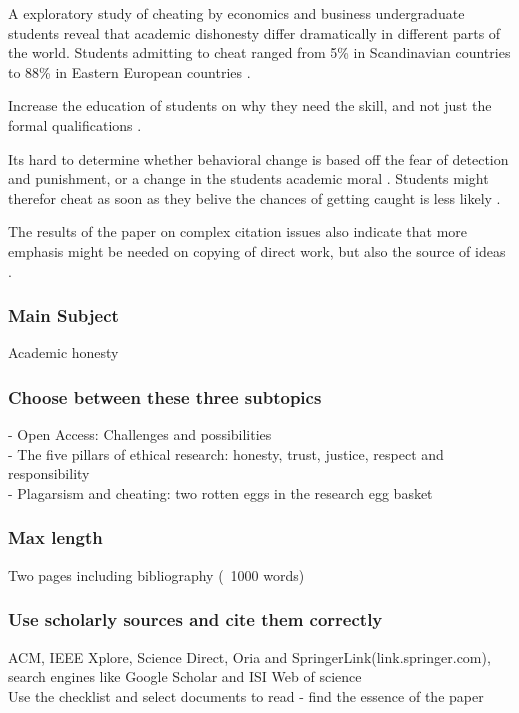 \documentclass[10pt,a4paper]{article}
\begin{document}
A exploratory study of cheating by economics and business undergraduate students reveal that academic dishonesty differ dramatically in different parts of the world. Students admitting to cheat ranged from 5\% in Scandinavian countries to 88\% in Eastern European countries \cite{Teixeira2010}.

Increase the education of students on why they need the skill, and not just the formal qualifications \cite{Walker2012}.

Its hard to determine whether behavioral change is based off the fear of detection and punishment, or a change in the students academic moral \cite{Dalal2015}. Students might therefor cheat as soon as they belive the chances of getting caught is less likely \cite{Dalal2015}. 

The results of the paper on complex citation issues also indicate that more emphasis might be needed on copying of direct work, but also the source of ideas \cite{Childers2016}. 


\clearpage

\subsubsection*{Main Subject}
Academic honesty

\subsubsection*{Choose between these three subtopics}

- Open Access: Challenges and possibilities\\
- The five pillars of ethical research: honesty, trust, justice, respect and responsibility\\
- Plagarsism and cheating: two rotten eggs in the research egg basket
\subsubsection*{Max length}
Two pages including bibliography (~1000 words)
\subsubsection*{Use scholarly sources and cite them correctly}
ACM, IEEE Xplore, Science Direct, Oria and SpringerLink(link.springer.com), search engines like Google Scholar and ISI Web of science\\
Use the checklist and select documents to read - find the essence of the paper
\end{document}
